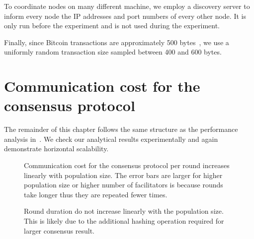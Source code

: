 To coordinate nodes on many different machine,
we employ a discovery server to inform every node the IP addresses and port numbers of every other node.
It is only run before the experiment and is not used during the experiment.

Finally, since Bitcoin transactions are approximately 500 bytes~\cite{txsize},
we use a uniformly random transaction size sampled between 400 and 600 bytes.


\section{Communication cost for the consensus protocol}
\label{sec:comms-cost-experiment}

The remainder of this chapter follows the same structure as the performance analysis in~.
We check our analytical results experimentally and again demonstrate horizontal scalability.

\begin{figure}[tb]
  \centering
  \caption{Communication cost for the consensus protocol per round increases linearly with population size.
  The error bars are larger for higher population size or higher number of facilitators is because rounds take longer thus they are repeated fewer times.}
  \label{fig:round-comms}
\end{figure}

\begin{figure}[tb]
  \centering
  \caption{Round duration do not increase linearly with the population size. 
  This is likely due to the additional hashing operation required for larger consensus result.}
  \label{fig:round-duration}
\end{figure}

